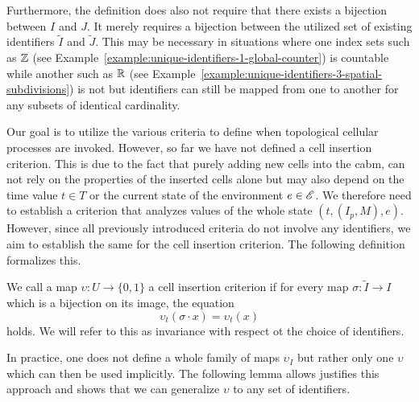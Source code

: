 Furthermore, the definition does also not require that there exists a bijection between $I$ and $J$.
It merely requires a bijection between the utilized set of existing identifiers $\tilde{I}$ and
$\tilde{J}$.
This may be necessary in situations where one index sets such as $\mathbb{Z}$ (see
Example~\ref{example:unique-identifiers-1-global-counter}) is countable while another
such as $\mathbb{R}$ (see Example~\ref{example:unique-identifiers-3-spatial-subdivisions}) is not but
identifiers can still be mapped from one to another for any subsets of identical cardinality.

Our goal is to utilize the various criteria to define when topological cellular processes are
invoked.
However, so far we have not defined a cell insertion criterion.
This is due to the fact that purely adding new cells into the \ac{cabm}, can not rely on the
properties of the inserted cells alone but may also depend on the time value $t\in T$ or the current
state of the environment $e\in\mathscr{E}$.
We therefore need to establish a criterion that analyzes values of the whole state $(t,(I_p,M),e)$.
However, since all previously introduced criteria do not involve any identifiers, we aim to
establish the same for the cell insertion criterion.
The following definition formalizes this.

\begin{definition}
    We call a map $\upsilon:U\rightarrow\{0,1\}$ a cell insertion criterion if for
    every map $\sigma:\tilde{I}\rightarrow I$ which is a bijection on its image, the equation
    \begin{equation}
        \upsilon_t(\sigma\cdot x) = \upsilon_t(x)
    \end{equation}
    holds.
    We will refer to this as invariance with respect ot the choice of identifiers.
\end{definition}

In practice, one does not define a whole family of maps $\upsilon_I$ but rather only one $\upsilon$
which can then be used implicitly.
The following lemma allows justifies this approach and shows that we can generalize $\upsilon$ to
any set of identifiers.

